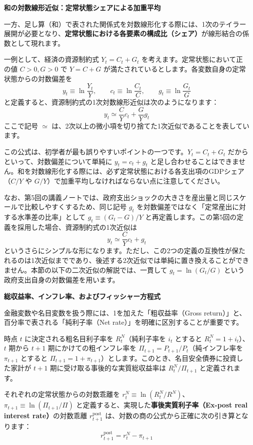 \documentclass[
  japanese,
  lualatex,
  ja=standard,
  12pt,
  a4paper]{ltjsarticle}
\begin{document}

\textbf{和の対数線形近似：定常状態シェアによる加重平均}

一方、足し算（和）で表された関係式を対数線形化する際には、1次のテイラー展開が必要となり、\textbf{定常状態における各要素の構成比（シェア）}が線形結合の係数として現れます。

一例として、経済の資源制約式 \(Y_t=C_t+G_t\)
を考えます。定常状態において正の値 \(C>0, G>0\) で \(Y=C+G\)
が満たされているとします。各変数自身の定常状態からの対数偏差を \[
y_t\equiv\ln\frac{Y_t}{Y},
\qquad
c_t\equiv\ln\frac{C_t}{C},
\qquad
g_t\equiv\ln\frac{G_t}{G}
\] と定義すると、資源制約式の1次対数線形近似は次のようになります： \[
y_t
\simeq
\frac{C}{Y}c_t+\frac{G}{Y}g_t
\] ここで記号 \(\simeq\)
は、2次以上の微小項を切り捨てた1次近似であることを表しています。

この公式は、初学者が最も誤りやすいポイントの一つです。\(Y_t=C_t+G_t\)
だからといって、対数偏差について単純に \(y_t=c_t+g_t\)
と足し合わせることはできません。和を対数線形化する際には、必ず定常状態における各支出項のGDPシェア（\(C/Y\)
や \(G/Y\)）で加重平均しなければならない点に注意してください。

なお、第5回の講義ノートでは、政府支出ショックの大きさを産出量と同じスケールで比較しやすくするため、同じ記号
\(g_t\) を対数偏差ではなく「定常産出に対する水準差の比率」として
\(g_t\equiv(G_t-G)/Y\)
と再定義します。この第5回の定義を採用した場合、資源制約式の1次近似は \[
y_t
\simeq
\frac{C}{Y}c_t+g_t
\]
というさらにシンプルな形になります。ただし、この2つの定義の互換性が保たれるのは1次近似までであり、後述する2次近似では単純に置き換えることができません。本節の以下の二次近似の解説では、一貫して
\(g_t=\ln(G_t/G)\) という政府支出自身の対数偏差を用います。

\textbf{総収益率、インフレ率、およびフィッシャー方程式}

金融変数や名目変数を扱う際には、1を加えた「粗収益率（Gross
return）」と、百分率で表される「純利子率（Net
rate）」を明確に区別することが重要です。

時点 \(t\) に決定される粗名目利子率を \(R_t^N\)（純利子率を \(i_t\)
とすると \(R_t^N=1+i_t\)）、\(t\) 期から \(t+1\)
期にかけての粗インフレ率を \(\Pi_{t+1}=P_{t+1}/P_t\)（純インフレ率を
\(\pi_{t+1}\) とすると
\(\Pi_{t+1}=1+\pi_{t+1}\)）とします。このとき、名目安全債券に投資した家計が
\(t+1\) 期に受け取る事後的な実質総収益率は \(R_t^N/\Pi_{t+1}\)
と定義されます。

それぞれの定常状態からの対数乖離を
\(r_t^N\equiv \ln(R_t^N/R^N)\)、\(\pi_{t+1}\equiv \ln(\Pi_{t+1}/\Pi)\)
と定義すると、実現した\textbf{事後実質利子率（Ex-post real interest
rate）}の対数乖離 \(r_{t+1}^{\mathrm{post}}\)
は、対数の商の公式から正確に次の引き算となります： \[
r_{t+1}^{\mathrm{post}}
=
r_t^N-\pi_{t+1}
\]
\end{document}
